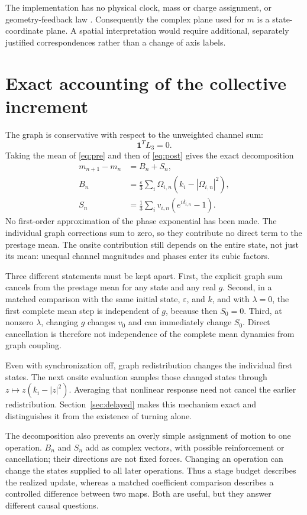\documentclass[11pt,a4paper]{article}
\numberwithin{equation}{section}
\theoremstyle{remark}\newtheorem{remark}[theorem]{Remark}
\newcommand{\one}{\mathbf1}\newcommand{\eps}{\varepsilon}
\begin{document}
The implementation has no physical clock, mass or charge assignment, or geometry-feedback law \cite{kernel}. Consequently the complex plane used for $m$ is a state-coordinate plane. A spatial interpretation would require additional, separately justified correspondences rather than a change of axis labels.

\section{Exact accounting of the collective increment}\label{sec:account}

The graph is conservative with respect to the unweighted channel sum:
\begin{equation}
\one^TL_3=0.
\end{equation}
Taking the mean of \eqref{eq:pre} and then of \eqref{eq:post} gives the exact decomposition
\begin{align}
m_{n+1}-m_n&=B_n+S_n,\label{eq:budget}\\
B_n&=\frac\eps3\sum_i\Omega_{i,n}(k_i-|\Omega_{i,n}|^2),\\
S_n&=\frac13\sum_i v_{i,n}(e^{i\delta_{i,n}}-1).
\end{align}
No first-order approximation of the phase exponential has been made. The individual graph corrections sum to zero, so they contribute no direct term to the prestage mean. The onsite contribution still depends on the entire state, not just its mean: unequal channel magnitudes and phases enter its cubic factors.

Three different statements must be kept apart. First, the explicit graph sum cancels from the prestage mean for any state and any real $g$. Second, in a matched comparison with the same initial state, $\eps$, and $k$, and with $\lambda=0$, the first complete mean step is independent of $g$, because then $S_0=0$. Third, at nonzero $\lambda$, changing $g$ changes $v_0$ and can immediately change $S_0$. Direct cancellation is therefore not independence of the complete mean dynamics from graph coupling.

Even with synchronization off, graph redistribution changes the individual first states. The next onsite evaluation samples those changed states through $z\mapsto z(k_i-|z|^2)$. Averaging that nonlinear response need not cancel the earlier redistribution. Section~\ref{sec:delayed} makes this mechanism exact and distinguishes it from the existence of turning alone.

The decomposition also prevents an overly simple assignment of motion to one operation. $B_n$ and $S_n$ add as complex vectors, with possible reinforcement or cancellation; their directions are not fixed forces. Changing an operation can change the states supplied to all later operations. Thus a stage budget describes the realized update, whereas a matched coefficient comparison describes a controlled difference between two maps. Both are useful, but they answer different causal questions.
\end{document}
